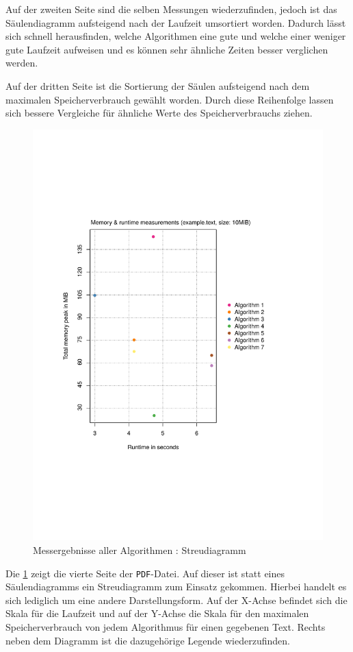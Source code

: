 Auf der zweiten Seite sind die selben Messungen wiederzufinden, jedoch ist das Säulendiagramm aufsteigend nach der Laufzeit umsortiert worden. Dadurch lässt sich schnell herausfinden, welche Algorithmen eine gute und welche einer weniger gute Laufzeit aufweisen und es können sehr ähnliche Zeiten besser verglichen werden.

Auf der dritten Seite ist die Sortierung der Säulen aufsteigend nach dem maximalen Spei\-cher\-ver\-brauch gewählt worden. Durch diese Reihenfolge lassen sich bessere Vergleiche für ähnliche Werte des Spei\-cher\-ver\-brauchs ziehen.

\begin{figure}
	\includegraphics[page = 1, width=.5\textwidth]{kapitel/3_framework/benchmark/sacabench-batch/beispiel_batch_streu.pdf}
	\caption{Messergebnisse aller Algorithmen : Streudiagramm}
	\label{pdf:benchmark:batch:streu}
\end{figure}

Die \cref{pdf:benchmark:batch:streu} zeigt die vierte Seite der \texttt{PDF}-Datei. Auf dieser ist statt eines Säulendiagramms ein Streudiagramm zum Einsatz gekommen. Hierbei handelt  es sich lediglich um eine andere Darstellungsform. Auf der X-Achse befindet sich die Skala für die Laufzeit und auf der Y-Achse die Skala für den maximalen Spei\-cher\-ver\-brauch von jedem Algorithmus für einen gegebenen Text. Rechts neben dem Diagramm ist die dazugehörige Legende wiederzufinden.

